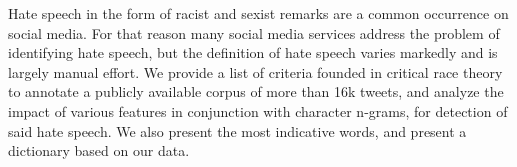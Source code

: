 Hate speech in the form of racist and sexist remarks are a common occurrence on social media. For that reason many social media services address the problem of identifying hate speech, but the definition of hate speech varies markedly and is largely manual effort. We provide a list of criteria founded in critical race theory to annotate a publicly available corpus of more than 16k tweets, and analyze the impact of various features in conjunction with character n-grams, for detection of said hate speech. We also present the most indicative words, and present a dictionary based on our data.
